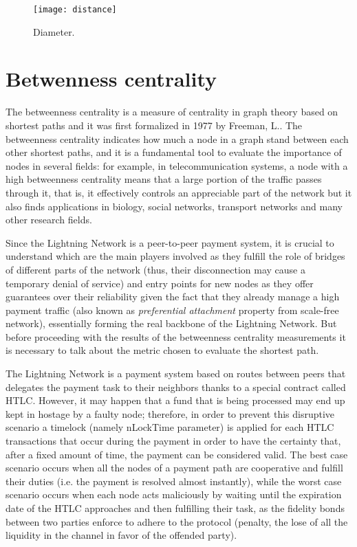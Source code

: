 	\begin{figure}
		\centering
		\texttt{[image: distance]}
		\caption{Diameter.}
		\label{monthly_diameter}
	\end{figure}

	\section{Betwenness	centrality}
	\label{sec:betweenness}
	
	The betweenness centrality is a measure of centrality in graph theory based on shortest paths and it was first formalized in 1977 by Freeman, L.\cite{Freeman1977}. The betweenness centrality indicates how much a node in a graph stand between each other shortest paths, and it is a fundamental tool to evaluate the importance of nodes in several fields: for example, in telecommunication systems, a node with a high betweenness centrality means that a large portion of the traffic passes through it, that is, it effectively controls an appreciable part of the network but it also finds applications in biology, social networks, transport networks and many other research fields. 
	
	Since the Lightning Network is a peer-to-peer payment system, it is crucial to understand which are the main players involved as they fulfill the role of bridges of different parts of the network (thus, their disconnection may cause a temporary denial of service) and entry points for new nodes as they offer guarantees over their reliability given the fact that they already manage a high payment traffic (also known as \textit{preferential attachment} property from scale-free network), essentially forming the real backbone of the Lightning Network. But before proceeding with the results of the betweenness centrality measurements it is necessary to talk about the metric chosen to evaluate the shortest path.
	
	The Lightning Network is a payment system based on routes between peers that delegates the payment task to their neighbors thanks to a special contract called HTLC. However, it may happen that a fund that is being processed may end up kept in hostage by a faulty node; therefore, in order to prevent this disruptive scenario a timelock (namely nLockTime parameter) is applied for each HTLC transactions that occur during the payment in order to have the certainty that, after a fixed amount of time, the payment can be considered valid. The best case scenario occurs when all the nodes of a payment path are cooperative and fulfill their duties (i.e. the payment is resolved almost instantly), while the worst case scenario occurs when each node acts maliciously by waiting until the expiration date of the HTLC approaches and then fulfilling their task, as the fidelity bonds between two parties enforce to adhere to the protocol (penalty, the lose of all the liquidity in the channel in favor of the offended party). 
	
